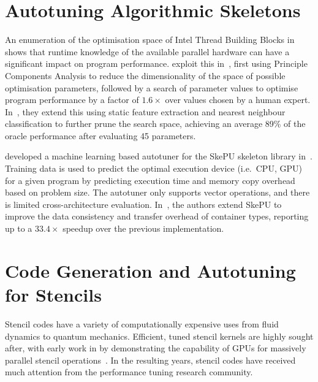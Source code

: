 \section{Autotuning Algorithmic Skeletons}

An enumeration of the optimisation space of Intel Thread Building
Blocks in~\cite{Contreras2008} shows that runtime knowledge of the
available parallel hardware can have a significant impact on program
performance. \citeauthor{Collins2012} exploit this
in~\cite{Collins2012}, first using Principle Components Analysis to
reduce the dimensionality of the space of possible optimisation
parameters, followed by a search of parameter values to optimise
program performance by a factor of $1.6\times$ over values chosen by a
human expert. In~\cite{Collins2013}, they extend this using static
feature extraction and nearest neighbour classification to further
prune the search space, achieving an average 89\% of the oracle
performance after evaluating 45 parameters.

\citeauthor{Dastgeer2011} developed a machine learning based autotuner
for the SkePU skeleton library in~\cite{Dastgeer2011}. Training data
is used to predict the optimal execution device (i.e.\ CPU, GPU) for a
given program by predicting execution time and memory copy overhead
based on problem size. The autotuner only supports vector operations,
and there is limited cross-architecture
evaluation. In~\cite{Dastgeer2015a}, the authors extend SkePU to
improve the data consistency and transfer overhead of container types,
reporting up to a $33.4\times$ speedup over the previous
implementation.


\section{Code Generation and Autotuning for Stencils}

Stencil codes have a variety of computationally expensive uses from
fluid dynamics to quantum mechanics. Efficient, tuned stencil kernels
are highly sought after, with early work in \citeyear{Bolz2003} by
\citeauthor{Bolz2003} demonstrating the capability of GPUs for
massively parallel stencil operations~\cite{Bolz2003}. In the
resulting years, stencil codes have received much attention from the
performance tuning research community.

